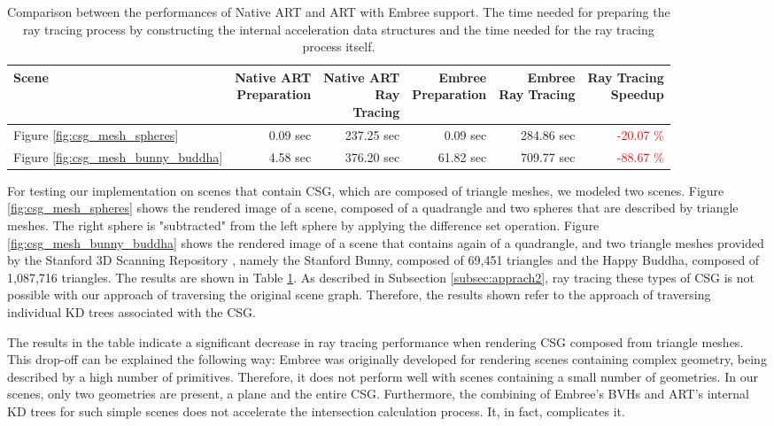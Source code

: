 \begin{table}[h]
	\centering
	{\footnotesize\sf
		\begin{tabular}{lrrrrr}
			\toprule
			Scene  & \thead{Native ART \\ Preparation} & \thead{Native ART \\ Ray \\ Tracing} & \thead{Embree \\ Preparation} & \thead{Embree \\ Ray Tracing} & \thead{Ray Tracing \\ Speedup} \\ 
			\midrule
			Figure \ref{fig:csg_mesh_spheres} & 0.09 sec & 237.25 sec & 0.09 sec & 284.86 sec & \textcolor{red}{-20.07 \%} \\
			Figure \ref{fig:csg_mesh_bunny_buddha} & 4.58 sec & 376.20 sec & 61.82 sec & 709.77 sec  & \textcolor{red}{-88.67 \%} \\
			\bottomrule
	\end{tabular}}
	\caption{Comparison between the performances of Native ART and ART with Embree support. The time needed for preparing the ray tracing process by constructing the internal acceleration data structures and the time needed for the ray tracing process itself.}
	\label{tab:csg_mesh}
\end{table}

For testing our implementation on scenes that contain CSG, which are composed of triangle meshes, we modeled two scenes. Figure \ref{fig:csg_mesh_spheres} shows the rendered image of a scene, composed of a quadrangle and two spheres that are described by triangle meshes. The right sphere is "subtracted" from the left sphere by applying the difference set operation. Figure \ref{fig:csg_mesh_bunny_buddha} shows the rendered image of a scene that contains again of a quadrangle, and two triangle meshes provided by the Stanford 3D Scanning Repository \cite{plyRepo}, namely the Stanford Bunny, composed of 69,451 triangles and the Happy Buddha, composed of 1,087,716 triangles. The results are shown in Table \ref{tab:csg_mesh}.
As described in Subsection \ref{subsec:apprach2}, ray tracing these types of CSG is not possible with our approach of traversing the original scene graph. Therefore, the results shown refer to the approach of traversing individual KD trees associated with the CSG.

The results in the table indicate a significant decrease in ray tracing performance when rendering CSG composed from triangle meshes. This drop-off can be explained the following way: Embree was originally developed for rendering scenes containing complex geometry, being described by a high number of primitives. Therefore, it does not perform well with scenes containing a small number of geometries. In our scenes, only two geometries are present, a plane and the entire CSG. Furthermore, the combining of Embree's BVHs and ART's internal KD trees for such simple scenes does not accelerate the intersection calculation process. It, in fact, complicates it.

